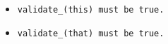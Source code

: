 \begin{itemize}[nosep]

\item \tt{validate_(this)} must be \tt{true}.

\item \tt{validate_(that)} must be \tt{true}.

\end{itemize}
